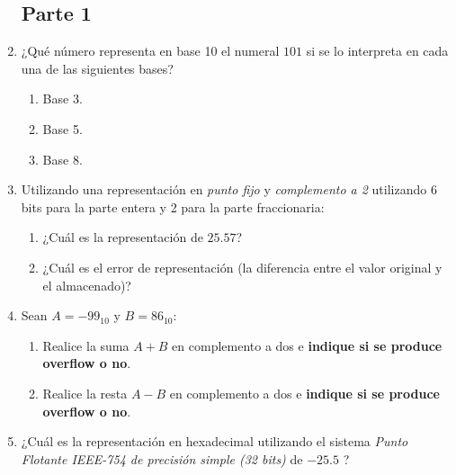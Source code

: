 \documentclass[12pt]{article}
\begin{document}
\begin{enumerate}
\subsection*{Parte 1}

    \item ¿Qué número representa en base 10 el numeral $101$ si se lo
        interpreta en cada una de las siguientes bases?

        \begin{enumerate}

            \item Base 3.

            \item Base 5.

            \item Base 8.

        \end{enumerate}

    \item Utilizando una representación en \emph{punto fijo} y
        \emph{complemento a 2} utilizando 6 bits para la parte entera y 2 para
        la parte fraccionaria:

        \begin{enumerate}

            \item ¿Cuál es la representación de $25.57$?

            \item ¿Cuál es el error de representación (la diferencia entre el
                valor original y el almacenado)?

        \end{enumerate}

    \item Sean $A=-99_{10}$ y $B=86_{10}$:

        \begin{enumerate}

            \item Realice la suma $A+B$ en complemento a dos e \textbf{indique
                si se produce overflow o no}.

            \item Realice la resta $A-B$ en complemento a dos e
                \textbf{indique si se produce overflow o no}.

        \end{enumerate}

    \item ¿Cuál es la representación en hexadecimal utilizando el sistema
        \emph{Punto Flotante IEEE-754 de precisión simple (32 bits)} de
        $-25.5$ ?


\end{enumerate}
\end{document}
